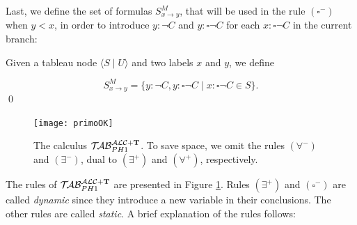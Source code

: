 \documentclass[a4paper, 11pt, oneside]{duthesis}
\newcommand{\tip}{{\bf T}}
\newcommand{\nott} {\lnot}
\newcommand{\tc} {\mid}
\newcommand{\imp} {\rightarrow}
\newcommand{\bbox}{\square}
\newcommand{\sx} {\langle}
\newcommand{\dx} {\rangle}
\newcommand{\perogni} {\forall}
\newcommand{\esiste} {\exists}
\newcommand{\Gammam}[2]{S^{M}_{#1 \imp #2}}
\newcommand{\primo}{\mathrel{{\mathcal{T}\!\mathcal{AB}}}_{PH 1}^{\mathcal{ALC}+\mbox{\scriptsize $\tip$}}}
\newenvironment{definition}
{\begin{defi} \rm}{\qed \end{defi}}
\newenvironment{definition}
{\begin{defi} \rm}{\qed \end{defi}}
\newtheorem{definition}{Definition}
\newcounter{posu}
\newtheorem{definition}[posu]{Definition}
\begin{document}
\noindent Last, we define the set of formulas $\Gammam{x}{y}$, that will be used in the rule $(\bbox^-)$ when $y<x$, in order to introduce $y: \nott C$ and $y: \bbox \nott C$ for each $x: \bbox \nott C$ in the current branch:

\begin{definition}
Given a tableau node $\sx S \tc U \dx$ and two labels $x$ and $y$, we define

$$\Gammam{x}{y}=\{y: \nott C, y: \bbox \nott C \tc x: \bbox \nott C \in S\}.$$
\end{definition}


\begin{figure}[t]{
\centerline{
	\texttt{[image: primoOK]}
	}
}
\caption{The calculus $\primo$. To save space, we omit the rules $(\perogni^-)$ and $(\esiste^-)$, dual to $(\esiste^+)$ and $(\perogni^+)$, respectively.}
\label{immagine calcolo}
\end{figure}


\noindent The rules of $\primo$ are presented in Figure \ref{immagine calcolo}.
Rules $(\esiste^{+})$ and $(\bbox^{-})$ are called \emph{dynamic} since they introduce a new variable in their conclusions.
The other rules are called \emph{static}.
A brief explanation of the rules follows:
\end{document}
